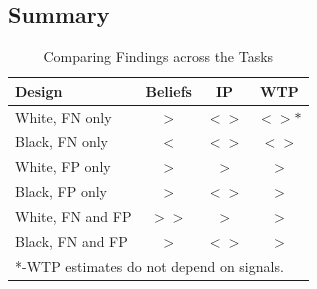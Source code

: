 \documentclass[12pt,a4paper]{article}
\begin{document}
%
%


\subsection{Summary}

\begin{table}[H]\centering
\caption{Comparing Findings across the Tasks}
\begin{tabular}{l|c|c|c}
\hline \hline
Design & Beliefs & IP &WTP\\
\hline
White, FN only & $>$ & $<>$ & $<>*$ \\
Black, FN only & $<$ & $<>$ & $<>$ \\
White, FP only & $>$ & $>$ & $>$ \\
Black, FP only & $>$ & $<>$ & $>$ \\
White, FN and FP & $>>$ & $>$ & $>$ \\
Black, FN and FP & $>$ & $<>$ & $>$\\
\hline
\multicolumn{4}{l}{*-WTP estimates do not depend on signals.}\\
\end{tabular}
\end{table}
\end{document}
